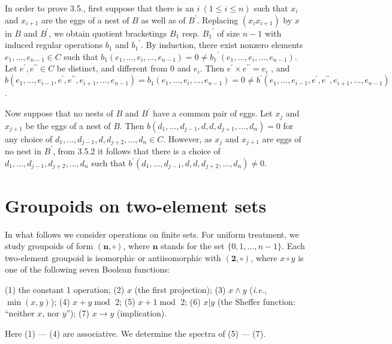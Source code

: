 \documentclass[a4paper,reqno]{amsart}\usepackage{amssymb,latexsym}
\theoremstyle{definition}
\theoremstyle{remark}
\numberwithin{equation}{section}
\numberwithin{theorem}{section}
\begin{document}
In order to prove 3.5., first suppose that there is an $i~(1\leq i\leq n)$
such that $x_{i}$ and $x_{i+1}$ are the eggs of a nest of $B$ as well as of
$B^{\prime}$. Replacing $(x_{i}x_{i+1})$ by $x$ in $B$ and $B^{\prime}$, we
obtain quotient bracketings $B_{1}$ resp. ${B_{1}}^{\prime}$ of size $n-1$
with induced regular operations $b_{1}$ and ${b_{1}}^{\prime}$. By induction,
there exist nonzero elements $e_{1},\ldots,e_{n-1}\in C$ such that ${b_{1}}(e_{1},\ldots,e_{i},\ldots,e_{n-1})=0\neq{b_{1}}^{\prime}(e_{1},\ldots
,e_{i},\ldots,e_{n-1})$. Let $e^{\prime},e^{\prime\prime}\in C$ be distinct,
and different from $0$ and $e_{i}$. Then $e^{\prime}\times e^{\prime\prime
}=e_{i}$ , and $b(e_{1},\ldots,e_{i-1},e^{\prime},e^{\prime\prime},e_{i+1},\ldots,e_{n-1})=b_{1}(e_{1},\ldots,e_{i},\ldots,e_{n-1})=0\neq
b^{\prime}(e_{1},\ldots,e_{i-1},\allowbreak e^{\prime},e^{\prime\prime
},e_{i+1},\ldots,e_{n-1})$.

Now suppose that no nests of $B$ and $B^{\prime}$ have a common pair of eggs.
Let $x_{j}$ and $x_{j+1}$ be the eggs of a nest of $B$. Then $b(d_{1},\ldots,d_{j-1},d,d,d_{j+1},\ldots,d_{n})=0$ for any choice of $d_{1},\ldots,d_{j-1},d,d_{j+2},\ldots,d_{n}\in C$. However, as $x_{j}$ and
$x_{j+1}$ are eggs of no nest in $B^{\prime}$, from 3.5.2 it follows that
there is a choice of $d_{1},\ldots,d_{j-1},d_{j+2},\ldots,d_{n}$ such that
$b^{\prime}(d_{1},\ldots,d_{j-1},d,d,d_{j+2},\ldots,d_{n})\neq0$.

\section{Groupoids on two-element sets}

In what follows we consider operations on finite sets. For uniform treatment,
we study groupoids of form $(\mathbf{n},\circ)$, where $\mathbf{n}$ stands for
the set $\{0,1,\ldots,n-1\}$. Each two-element groupoid is isomorphic or
antiisomorphic with $(\mathbf{2},\circ)$, where $x\circ y$ is one of the
following seven Boolean functions:

(1) the constant 1 operation; (2) $x$ (the first projection); (3) $x\wedge y$
(\textit{i.e.}, $\min(x,y)$); (4) $x+y$\thinspace$\operatorname{mod}$ 2; (5)
$x+1$\thinspace$\operatorname{mod}$ 2; (6) $x|y$ (the Sheffer function:
\textquotedblleft neither $x$, nor $y$\textquotedblright); (7) $x\rightarrow
y$ (implication).

Here (1) --- (4) are associative. We determine the spectra of (5) --- (7).

\bigskip
\end{document}
